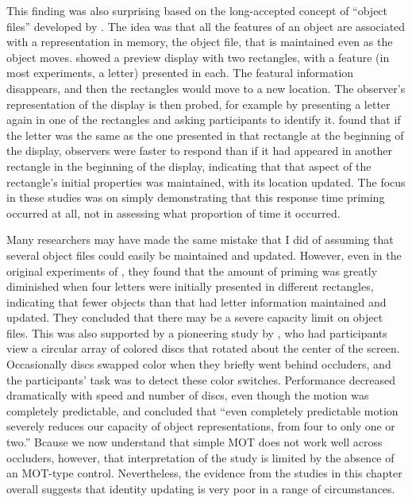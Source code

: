 \documentclass[
]{book}
\begin{document}
This finding was also surprising based on the long-accepted concept of ``object files'' developed by \citet{kahnemanReviewingObjectFiles1992}. The idea was that all the features of an object are associated with a representation in memory, the object file, that is maintained even as the object moves. \citet{kahnemanReviewingObjectFiles1992} showed a preview display with two rectangles, with a feature (in most experiments, a letter) presented in each. The featural information disappears, and then the rectangles would move to a new location. The observer's representation of the display is then probed, for example by presenting a letter again in one of the rectangles and asking participants to identify it. \citet{kahnemanReviewingObjectFiles1992}
found that if the letter was the same as the one presented in that rectangle at the beginning of the display, observers were faster to respond than if it had appeared in another rectangle in the beginning of the display, indicating that that aspect of the rectangle's initial properties was maintained, with its location updated. The focus in these studies was on simply demonstrating that this response time priming occurred at all, not in assessing what proportion of time it occurred.

Many researchers may have made the same mistake that I did of assuming that several object files could easily be maintained and updated. However, even in the original experiments of \citet{kahnemanReviewingObjectFiles1992}, they found that the amount of priming was greatly diminished when four letters were initially presented in different rectangles, indicating that fewer objects than that had letter information maintained and updated. They concluded that there may be a severe capacity limit on object files. This was also supported by a pioneering study by \citet{saikiMultipleobjectPermanenceTracking2002}, who had participants view a circular array of colored discs that rotated about the center of the screen. Occasionally discs swapped color when they briefly went behind occluders, and the participants' task was to detect these color switches. Performance decreased dramatically with speed and number of discs, even though the motion was completely predictable, and \citet{saikiMultipleobjectPermanenceTracking2002} concluded that ``even completely predictable motion severely reduces our capacity of object representations, from four to only one or two.'' Bcause we now understand that simple MOT does not work well across occluders, however, that interpretation of the study is limited by the absence of an MOT-type control. Nevertheless, the evidence from the studies in this chapter overall suggests that identity updating is very poor in a range of circumstances.
\end{document}
